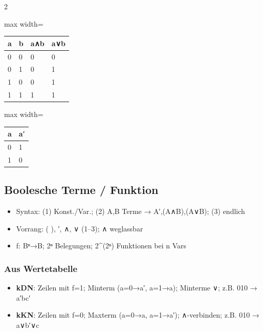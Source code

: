 \documentclass[10pt, a4paper]{article}
\begin{document}
\begin{multicols}{2}
{\small
\begin{adjustbox}{max width=\linewidth}
{\scriptsize
\begin{tabular}{llll}
\toprule
\textbf{a} & \textbf{b} & \textbf{a∧b} & \textbf{a∨b} \\
\midrule
0 & 0 & 0 & 0 \\
0 & 1 & 0 & 1 \\
1 & 0 & 0 & 1 \\
1 & 1 & 1 & 1 \\
\bottomrule
\end{tabular}
}
\end{adjustbox}
}



{\small
\begin{adjustbox}{max width=\linewidth}
{\scriptsize
\begin{tabular}{ll}
\toprule
\textbf{a} & \textbf{a′} \\
\midrule
0 & 1 \\
1 & 0 \\
\bottomrule
\end{tabular}
}
\end{adjustbox}
}



\subsection{Boolesche Terme / Funktion}
\begin{itemize}
  \item Syntax: (1) Konst./Var.; (2) A,B Terme → A′,(A∧B),(A∨B); (3) endlich
  \item Vorrang: ( ), ′, ∧, ∨ (1–3); ∧ weglassbar
  \item f: Bⁿ→B; 2ⁿ Belegungen; 2\textasciicircum{}(2ⁿ) Funktionen bei n Vars
\end{itemize}


\subsubsection{Aus Wertetabelle}
\begin{itemize}
  \item \textbf{kDN}: Zeilen mit f=1; Minterm (a=0→a′, a=1→a); Minterme ∨; z.B. 010 → a′bc′
  \item \textbf{kKN}: Zeilen mit f=0; Maxterm (a=0→a, a=1→a′); ∧-verbinden; z.B. 010 → a∨b′∨c
\end{itemize}



\end{multicols}
\end{document}

